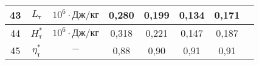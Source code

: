 \begin{landscape}
\begin{center}
\begin{longtable}{|c|c|c|c|c|c|c|c|}
            43 & $L_т$ & $10^6 \cdot Дж/кг$ & 0,280 & 0,199 & 0,134 & 0,171 \\\hline
            
            44 & $H_т^*$ & $10^6 \cdot Дж/кг$ & 0,318 & 0,221 & 0,147 & 0,187 \\\hline
            
            45 & $\eta_т^*$ & $-$ & 0,88 & 0,90 & 0,91 & 0,91 \\\hline
            
        \end{longtable}
    \end{center}
\end{landscape}